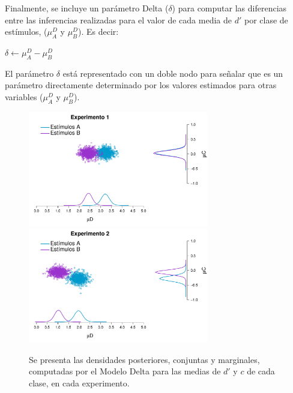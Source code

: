 \begin{itemize}
Finalmente, se incluye un parámetro Delta ($\delta$) para computar las diferencias entre las inferencias realizadas para el valor de cada media de $d'$ por clase de estímulos, ($\mu^D_{A}$ y $\mu^D_{B}$). Es decir:

\begin{center}
$\delta \gets \mu^D_{A}-\mu^D_{B}$\\
\end{center}

El parámetro $\delta$ está representado con un doble nodo para señalar que es un parámetro directamente determinado por los valores estimados para otras variables ($\mu^D_{A}$ y $\mu^D_{B}$).\\
\end{itemize} 

\begin{figure}[bh]
\centering
\includegraphics[width=0.7\textwidth]{Figures/MDelta_Joint_E1}\\
\includegraphics[width=0.7\textwidth]{Figures/MDelta_Joint_E2}\\
\decoRule
\caption[Modelo Delta: Distribuciones posteriores marginales y conjuntas para $\mu d'$ y $\mu c$ por cada clase de estímulo]{Se presenta las densidades posteriores, conjuntas y marginales, computadas por el Modelo Delta para las medias de $d'$ y $c$ de cada clase, en cada experimento.}
\label{fig:Delta_Joints}
\end{figure}

